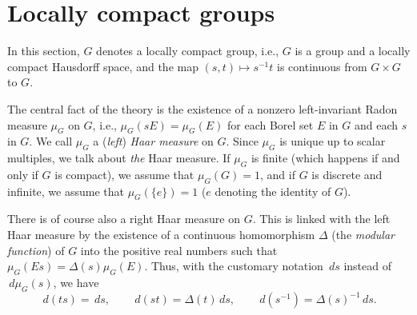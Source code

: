 \documentclass{book}
\begin{document}
\section{Locally compact groups}\label{section:28}
In this section, \(G\) denotes a locally compact group, i.e., \(G\) is a group and 
a locally compact Hausdorff space, and the map \((s,t)\mapsto s^{-1}t\) is continuous 
from \(G\times G\) to \(G\).\par
The central fact of the theory is the existence of a nonzero left-invariant Radon measure \(\mu_G\)
on \(G\), i.e., \(\mu_G(sE)=\mu_G(E)\) for each Borel set \(E\) in \(G\) and each \(s\) in \(G\).
We call \(\mu_G\) a (\textit{left}) \textit{Haar measure} on \(G\). Since \(\mu_G\) is unique 
up to scalar multiples, we talk about \textit{the} Haar measure. If \(\mu_G\) is finite
(which happens if and only if \(G\) is compact), we assume that \(\mu_G(G)=1\), and if \(G\) is discrete and infinite, we assume
that \(\mu_G(\{e\})=1\) (\(e\) denoting the identity of \(G\)).\par
There is of course also a right Haar measure on \(G\). This is linked with the left Haar measure by the existence of a continuous homomorphism
\(\Delta\) (the \textit{modular function}) of \(G\) into the positive real numbers such that \(\mu_G(Es)=\Delta(s)\mu_G(E)\).
Thus, with the customary notation \(\,ds\) instead of \(\,d\mu_G(s)\), we have
\[
  \,d(ts)=\,ds,\qquad \,d(st)=\Delta(t)\,ds,\qquad\,d(s^{-1})=\Delta(s)^{-1}\,ds.
\]\par
\end{document}
